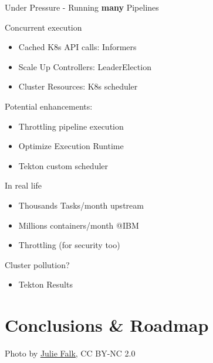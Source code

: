 \documentclass[aspectratio=169,11pt,hyperref={colorlinks=true}]{beamer}
\begin{document}
\begin{2columnsframe}%
  {%
    Under Pressure - Running \textbf{many} Pipelines%
  }%
  {%
  Concurrent execution
  \begin{itemize}
    \item Cached K8s API calls: Informers
    \item Scale Up Controllers: LeaderElection
    \item Cluster Resources: K8s scheduler
  \end{itemize}
  \vspace{0.17\textheight}
  Potential enhancements:
  \begin{itemize}
    \item Throttling pipeline execution
    \item Optimize Execution Runtime
    \item Tekton custom scheduler
  \end{itemize}
  }%
  {%
  In real life
  \begin{itemize}
    \item Thousands Tasks/month upstream
    \item Millions containers/month @IBM
    \item Throttling (for security too)
  \end{itemize}
  \vspace{0.17\textheight}
  Cluster pollution?
  \begin{itemize}
    \item Tekton Results
  \end{itemize}
  }
\end{2columnsframe}

\section[Conclusions]{Conclusions \& Roadmap}
\begin{sectionwithpich}{Photo by \href{https://www.flickr.com/photos/piper/}{\underline{Julie Falk}}, CC BY-NC 2.0}
\end{sectionwithpich}
\end{document}
